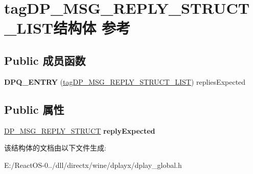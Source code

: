 \hypertarget{structtag_d_p___m_s_g___r_e_p_l_y___s_t_r_u_c_t___l_i_s_t}{}\section{tag\+D\+P\+\_\+\+M\+S\+G\+\_\+\+R\+E\+P\+L\+Y\+\_\+\+S\+T\+R\+U\+C\+T\+\_\+\+L\+I\+S\+T结构体 参考}
\label{structtag_d_p___m_s_g___r_e_p_l_y___s_t_r_u_c_t___l_i_s_t}
\subsection*{Public 成员函数}
\begin{DoxyCompactItemize}
\item 
\mbox{\label{structtag_d_p___m_s_g___r_e_p_l_y___s_t_r_u_c_t___l_i_s_t_a97ac6828c7e7db633d800bb9dff98981}} 
{\bfseries D\+P\+Q\+\_\+\+E\+N\+T\+RY} (\hyperlink{structtag_d_p___m_s_g___r_e_p_l_y___s_t_r_u_c_t___l_i_s_t}{tag\+D\+P\+\_\+\+M\+S\+G\+\_\+\+R\+E\+P\+L\+Y\+\_\+\+S\+T\+R\+U\+C\+T\+\_\+\+L\+I\+ST}) replies\+Expected
\end{DoxyCompactItemize}
\subsection*{Public 属性}
\begin{DoxyCompactItemize}
\item 
\mbox{\label{structtag_d_p___m_s_g___r_e_p_l_y___s_t_r_u_c_t___l_i_s_t_a5d9b697c4a31534bf90c988ed48ada12}} 
\hyperlink{structtag_d_p___m_s_g___r_e_p_l_y___s_t_r_u_c_t}{D\+P\+\_\+\+M\+S\+G\+\_\+\+R\+E\+P\+L\+Y\+\_\+\+S\+T\+R\+U\+CT} {\bfseries reply\+Expected}
\end{DoxyCompactItemize}


该结构体的文档由以下文件生成\+:\begin{DoxyCompactItemize}
\item 
E\+:/\+React\+O\+S-\/0../dll/directx/wine/dplayx/dplay\+\_\+global.\+h\end{DoxyCompactItemize}
